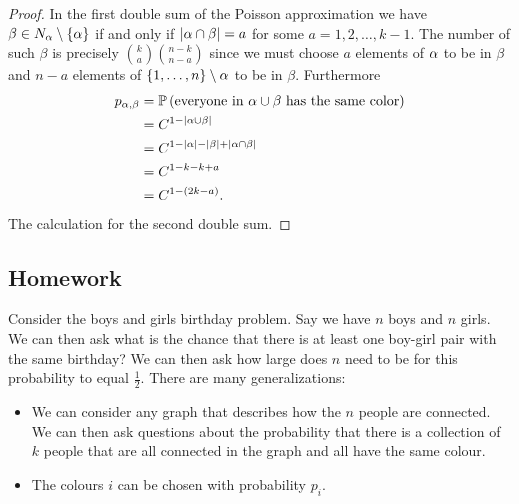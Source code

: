 \begin{proof}
    In the first double sum of the Poisson approximation we have $\beta \in N_{\alpha} \setminus \{{\alpha}\}$ if and only if ${\left\lvert{\alpha} \cap \beta\right\rvert}=a$ for some $a = 1,2,\ldots,k-1$. The number of such $\beta$ is precisely $\binom{k}{a}\binom{n-k}{n-a}$ since we must choose $a$ elements of ${\alpha}$ to be in $\beta$ and $n-a$ elements of $\{1,\ldots,n\} \setminus {\alpha}$ to be in $\beta$. Furthermore
    \begin{align*}
        p_{{\alpha},\beta}&= {\mathbb{P}}\left(\text{everyone in } {\alpha} \cup \beta \text{ has the same color}\right)\\
        &=C^{1-{\left\lvert{\alpha} \cup \beta\right\rvert}}\\
        &=C^{1-{\left\lvert{\alpha}\right\rvert}-{\left\lvert\beta\right\rvert}+{\left\lvert{\alpha} \cap \beta\right\rvert}}\\
        &=C^{1-k-k+a}\\
        &=C^{1-(2k-a)}.
    \end{align*}
    The calculation for the second double sum.
\end{proof}
\subsection{Homework}
Consider the boys and girls birthday problem. Say we have $n$ boys and $n$ girls. We can then ask what is the chance that there is at least one boy-girl pair with the same birthday? We can then ask how large does $n$ need to be for this probability to equal $\frac{1}{2}$. There are many generalizations:
\begin{itemize}
    \item We can consider any graph that describes how the $n$ people are connected. We can then ask questions about the probability that there is a collection of $k$ people that are all connected in the graph and all have the same colour.
    \item The colours $i$ can be chosen with probability $p_i$. 
\end{itemize}

